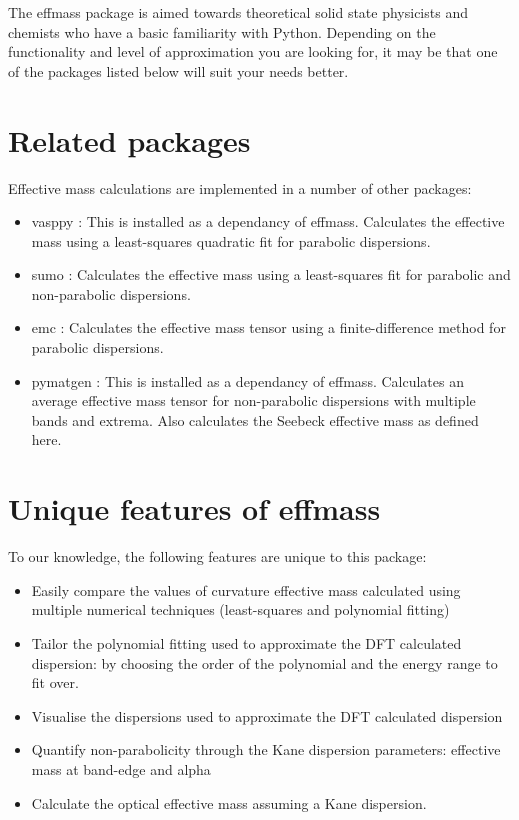 The effmass package is aimed towards theoretical solid state physicists and chemists who have a basic familiarity with Python. Depending on the functionality and level of approximation you are looking for, it may be that one of the packages listed below will suit your needs better.

\section{Related packages}
\label{sec:related}

Effective mass calculations are implemented in a number of other packages:
\begin{itemize}
    \item vasppy \cite{Morgan2018}: This is installed as a dependancy of effmass. Calculates the effective mass using a least-squares quadratic fit for parabolic dispersions.
    \item sumo \cite{Ganose2018}: Calculates the effective mass using a least-squares fit for parabolic and non-parabolic dispersions.
    \item emc \cite{Fornari2012}: Calculates the effective mass tensor using a finite-difference method for parabolic dispersions.
    \item pymatgen \cite{Ong2013}: This is installed as a dependancy of effmass. Calculates an average effective mass tensor for non-parabolic dispersions with multiple bands and extrema. Also calculates the Seebeck effective mass as defined here.
\end{itemize}

\section{Unique features of effmass}
\label{sec:unique}

To our knowledge, the following features are unique to this package:
\begin{itemize}
    \item Easily compare the values of curvature effective mass calculated using multiple numerical techniques (least-squares and polynomial fitting)
    \item Tailor the polynomial fitting used to approximate the DFT calculated dispersion: by choosing the order of the polynomial and the energy range to fit over.
    \item Visualise the dispersions used to approximate the DFT calculated dispersion
    \item Quantify non-parabolicity through the Kane dispersion parameters: effective mass at band-edge and alpha
    \item Calculate the optical effective mass assuming a Kane dispersion.
\end{itemize}

